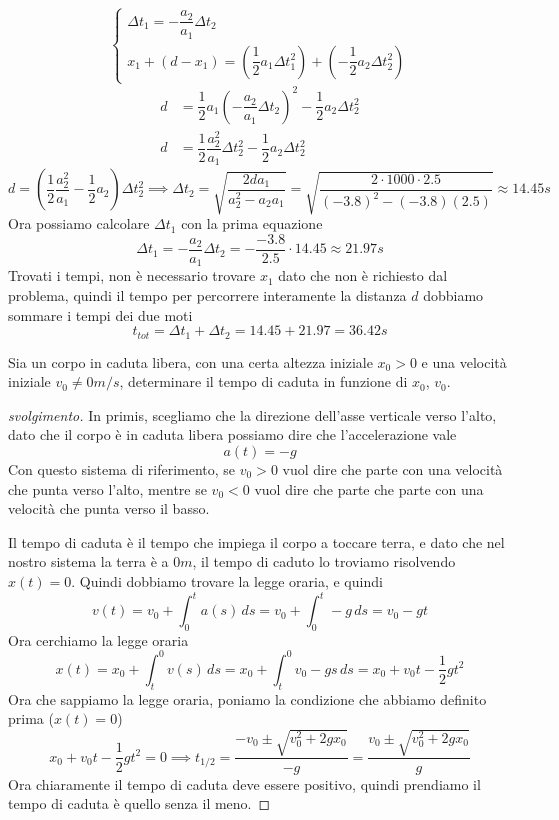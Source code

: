 \documentclass{rapport}
\begin{document}
\[\begin{cases}
  \Delta t_1 = -\dfrac{a_2}{a_1}\Delta t_2 \\
  x_1 + (d-x_1) = \left(\dfrac{1}{2}a_1\Delta t_1^2\right) + \left(-\dfrac{1}{2}a_2\Delta t_2^2\right)
\end{cases}
\]
\begin{align*}
  d &= \dfrac{1}{2}a_1\left(-\dfrac{a_2}{a_1}\Delta t_2\right)^2  - \dfrac{1}{2}a_2\Delta t_2^2 \\
  d &= \dfrac{1}{2}\dfrac{a^2_2}{a_1}\Delta t_2^2 - \dfrac{1}{2}a_2\Delta t_2^2  
  \end{align*}
  \[
  d = \left(\dfrac{1}{2}\dfrac{a^2_2}{a_1} - \dfrac{1}{2}a_2 \right)\Delta t_2^2  \implies \Delta t_2 = \sqrt{\dfrac{2da_1}{a_2^2-a_2a_1}} = \sqrt{\dfrac{2\cdot 1000 \cdot 2.5}{(-3.8)^2-(-3.8)(2.5)}} \approx 14.45s
  \]
  Ora possiamo calcolare $\Delta t_1$ con la prima equazione
  \[
  \Delta t_1 = -\dfrac{a_2}{a_1}\Delta t_2 = -\dfrac{-3.8}{2.5}\cdot 14.45 \approx 21.97s 
  \]
  Trovati i tempi, non è necessario trovare $x_1$ dato che non è richiesto dal problema, quindi il tempo per percorrere interamente la distanza $d$ dobbiamo sommare i tempi dei due moti
  \[
  t_{tot} = \Delta t_1 +\Delta t_2 = 14.45 + 21.97 = 36.42s
  \]
\begin{esercizio}{}{}
  Sia un corpo in caduta libera, con una certa altezza iniziale $x_0 > 0$ e una velocità iniziale $v_0 \ne 0m/s$, determinare il tempo di caduta in funzione di $x_0$, $v_0$. 
\end{esercizio}
\begin{proof}[svolgimento]
  In primis, scegliamo che la direzione dell'asse verticale verso l'alto, dato che il corpo è in caduta libera possiamo dire che l'accelerazione vale
  \[
  a(t)=-g
  \]
  Con questo sistema di riferimento, se $v_0>0$ vuol dire che parte con una velocità che punta verso l'alto, mentre se $v_0 <0$ vuol dire che parte che parte con una velocità che punta verso il basso. 
  
  Il tempo di caduta è il tempo che impiega il corpo a toccare terra, e dato che nel nostro sistema la terra è a $0m$, il tempo di caduto lo troviamo risolvendo $x(t) = 0$. Quindi dobbiamo trovare la legge oraria, e quindi 
  \[
  v(t) = v_0 + \int^t_0 a(s)\,ds = v_0 + \int^t_0 -g\,ds = v_0 -gt
  \]
  Ora cerchiamo la legge oraria
  \[
  x(t) = x_0 + \int_{t}^{0} v(s)\,ds = x_0 + \int_{t}^{0}  v_0 -gs\,ds = x_0  + v_0t-\dfrac{1}{2}gt^2
  \]
  Ora che sappiamo la legge oraria, poniamo la condizione che abbiamo definito prima ($x(t)=0$)
  \[
  x_0  + v_0t-\dfrac{1}{2}gt^2 = 0 \implies t_{1/2} = \dfrac{-v_0 \pm \sqrt{v_0^2 + 2gx_0}}{-g} = \dfrac{v_0 \pm \sqrt{v_0^2 + 2gx_0}}{g}
  \]
  Ora chiaramente il tempo di caduta deve essere positivo, quindi prendiamo il tempo di caduta è quello senza il meno.
\end{proof}
\end{document}
